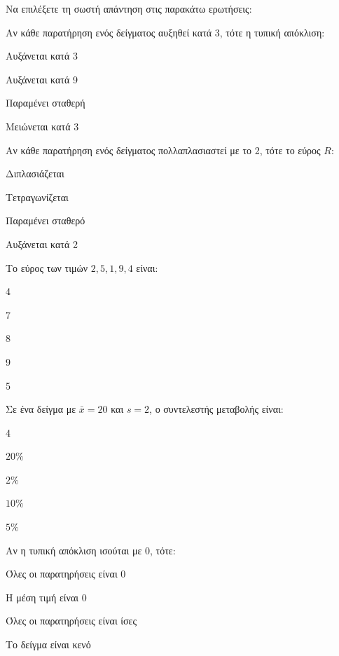 \documentclass[11pt,a4paper,modern]{FFExercises}
\begin{document}
\askhsh
Να επιλέξετε τη σωστή απάντηση στις παρακάτω ερωτήσεις:
\begin{alist}
    \item Αν κάθε παρατήρηση ενός δείγματος αυξηθεί κατά 3, τότε η τυπική απόκλιση:
    \begin{alist}
        \item Αυξάνεται κατά 3
        \item Αυξάνεται κατά 9
        \item Παραμένει σταθερή
        \item Μειώνεται κατά 3
    \end{alist}
    
    \item Αν κάθε παρατήρηση ενός δείγματος πολλαπλασιαστεί με το 2, τότε το εύρος $R$:
    \begin{alist}
        \item Διπλασιάζεται
        \item Τετραγωνίζεται
        \item Παραμένει σταθερό
        \item Αυξάνεται κατά 2
    \end{alist}
    
    \item Το εύρος των τιμών $2, 5, 1, 9, 4$ είναι:
\begin{multicols}{4}
    \begin{alist}
        \item 7
        \item 8
        \item 9
        \item 5
    \end{alist}
\end{multicols}
        
    \item Σε ένα δείγμα με $\bar{x}=20$ και $s=2$, ο συντελεστής μεταβολής είναι:
\begin{multicols}{4}
    \begin{alist}
        \item $20\%$
        \item $2\%$
        \item $10\%$
        \item $5\%$
    \end{alist}
\end{multicols}
    
    \item Αν η τυπική απόκλιση ισούται με 0, τότε:
    \begin{alist}
        \item Όλες οι παρατηρήσεις είναι 0
        \item Η μέση τιμή είναι 0
        \item Όλες οι παρατηρήσεις είναι ίσες
        \item Το δείγμα είναι κενό
    \end{alist}
\end{alist}
\end{document}
